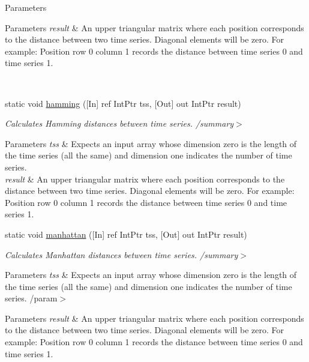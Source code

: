 \begin{DoxyCompactItemize}
\begin{DoxyCompactList}
\begin{DoxyParams}{Parameters}
\begin{DoxyParams}{Parameters}
{\em result} & An upper triangular matrix where each position corresponds to the distance between two time series. Diagonal elements will be zero. For example\+: Position row 0 column 1 records the distance between time series 0 and time series 1.\\
\hline
\end{DoxyParams}
\\
\hline
\end{DoxyParams}
\end{DoxyCompactList}\item 
static void \mbox{\hyperlink{classkhiva_1_1interop_1_1_d_l_l_distances_a684f7b2f7009e190ec568fb71b0a725d}{hamming}} (\mbox{[}In\mbox{]} ref Int\+Ptr tss, \mbox{[}Out\mbox{]} out Int\+Ptr result)
\begin{DoxyCompactList}\small\item\em Calculates Hamming distances between time series. /summary$>$ 
\begin{DoxyParams}{Parameters}
{\em tss} & Expects an input array whose dimension zero is the length of the time series (all the same) and dimension one indicates the number of time series.\\
\hline
{\em result} & An upper triangular matrix where each position corresponds to the distance between two time series. Diagonal elements will be zero. For example\+: Position row 0 column 1 records the distance between time series 0 and time series 1.\\
\hline
\end{DoxyParams}
\end{DoxyCompactList}\item 
static void \mbox{\hyperlink{classkhiva_1_1interop_1_1_d_l_l_distances_a739d40b582b68694ea71525d7092768f}{manhattan}} (\mbox{[}In\mbox{]} ref Int\+Ptr tss, \mbox{[}Out\mbox{]} out Int\+Ptr result)
\begin{DoxyCompactList}\small\item\em Calculates Manhattan distances between time series. /summary$>$ 
\begin{DoxyParams}{Parameters}
{\em tss} & Expects an input array whose dimension zero is the length of the time series (all the same) and dimension one indicates the number of time series. /param$>$ 
\begin{DoxyParams}{Parameters}
{\em result} & An upper triangular matrix where each position corresponds to the distance between two time series. Diagonal elements will be zero. For example\+: Position row 0 column 1 records the distance between time series 0 and time series 1.\\

\end{DoxyParams}
\end{DoxyParams}
\end{DoxyCompactList}
\end{DoxyCompactItemize}
